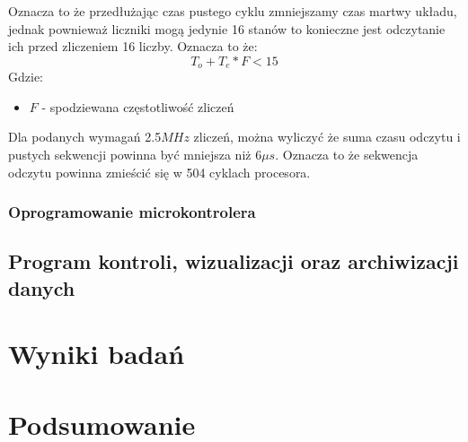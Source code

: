 \documentclass[a4paper,12pt]{article}
\begin{document}
Oznacza to że przedłużając czas pustego cyklu zmniejszamy czas martwy układu, jednak pownieważ liczniki mogą jedynie 16 stanów to konieczne jest odczytanie ich przed zliczeniem 16 liczby. 
Oznacza to że:
\begin{equation}
        T_o+T_e * F < 15
\end{equation}
        Gdzie:
\begin{itemize}
        \item $F$ - spodziewana częstotliwość zliczeń
\end{itemize}

Dla podanych wymagań 2.5$MHz$ zliczeń, można wyliczyć że suma czasu odczytu i pustych sekwencji powinna być mniejsza niż 6$\mu s$.
Oznacza to że sekwencja odczytu powinna zmieścić się w 504 cyklach procesora. 

\subsubsection{Oprogramowanie microkontrolera}
\subsection{Program kontroli, wizualizacji oraz archiwizacji danych}

\section{Wyniki badań}

\section{Podsumowanie}
\end{document}
